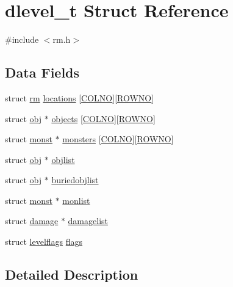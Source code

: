 \hypertarget{structdlevel__t}{\section{dlevel\+\_\+t Struct Reference}
\label{structdlevel__t}
}


{\ttfamily \#include $<$rm.\+h$>$}

\subsection*{Data Fields}
\begin{DoxyCompactItemize}
\item 
struct \hyperlink{structrm}{rm} \hyperlink{structdlevel__t_ae17c672658868c49486afbdc64c4e4b7}{locations} \mbox{[}\hyperlink{gnmap_8c_a308dbfcc29f5a427c0315f3cbf03c3ed}{C\+O\+L\+N\+O}\mbox{]}\mbox{[}\hyperlink{gnmap_8c_a9cce134868d97b23c35bcf1ff4a343d8}{R\+O\+W\+N\+O}\mbox{]}
\item 
struct \hyperlink{structobj}{obj} $\ast$ \hyperlink{structdlevel__t_ac128f805d01d7746b499596dd3b92a53}{objects} \mbox{[}\hyperlink{gnmap_8c_a308dbfcc29f5a427c0315f3cbf03c3ed}{C\+O\+L\+N\+O}\mbox{]}\mbox{[}\hyperlink{gnmap_8c_a9cce134868d97b23c35bcf1ff4a343d8}{R\+O\+W\+N\+O}\mbox{]}
\item 
struct \hyperlink{structmonst}{monst} $\ast$ \hyperlink{structdlevel__t_abe8e54209520b4c30e1c8a5364ff1457}{monsters} \mbox{[}\hyperlink{gnmap_8c_a308dbfcc29f5a427c0315f3cbf03c3ed}{C\+O\+L\+N\+O}\mbox{]}\mbox{[}\hyperlink{gnmap_8c_a9cce134868d97b23c35bcf1ff4a343d8}{R\+O\+W\+N\+O}\mbox{]}
\item 
struct \hyperlink{structobj}{obj} $\ast$ \hyperlink{structdlevel__t_afee783efef1938e1008410cd3e182f2f}{objlist}
\item 
struct \hyperlink{structobj}{obj} $\ast$ \hyperlink{structdlevel__t_a3f47ab569a36a0574eb4363915fe2fae}{buriedobjlist}
\item 
struct \hyperlink{structmonst}{monst} $\ast$ \hyperlink{structdlevel__t_a775d40e9ce8233f0079bc9c0af234fa1}{monlist}
\item 
struct \hyperlink{structdamage}{damage} $\ast$ \hyperlink{structdlevel__t_a32cc1062d668db12f8f02ff2ea0d3fcd}{damagelist}
\item 
struct \hyperlink{structlevelflags}{levelflags} \hyperlink{structdlevel__t_ad52c01d015e2456cdae3300848115916}{flags}
\end{DoxyCompactItemize}


\subsection{Detailed Description}


